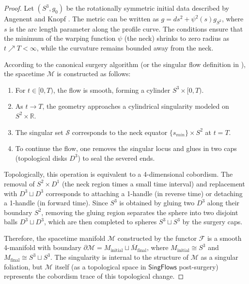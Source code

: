 \documentclass[11pt]{article}
\newcommand{\SingFlows}{\mathsf{SingFlows}}
\begin{document}
\begin{proof}
Let $(S^3, g_0)$ be the rotationally symmetric initial data described by Angenent and Knopf \cite{AK04}. The metric can be written as $g = ds^2 + \psi^2(s) g_{S^2}$, where $s$ is the arc length parameter along the profile curve. The conditions ensure that the minimum of the warping function $\psi$ (the neck) shrinks to zero radius as $t \nearrow T < \infty$, while the curvature remains bounded away from the neck.

According to the canonical surgery algorithm (or the singular flow definition in \cite{KL17}), the spacetime $\mathcal{M}$ is constructed as follows:
\begin{enumerate}
    \item For $t \in [0, T)$, the flow is smooth, forming a cylinder $S^3 \times [0, T)$.
    \item As $t \to T$, the geometry approaches a cylindrical singularity modeled on $S^2 \times \mathbb{R}$.
    \item The singular set $\mathcal{S}$ corresponds to the neck equator $\{s_{min}\} \times S^2$ at $t=T$.
    \item To continue the flow, one removes the singular locus and glues in two caps (topological disks $D^3$) to seal the severed ends.
\end{enumerate}

Topologically, this operation is equivalent to a 4-dimensional cobordism. The removal of $S^2 \times D^1$ (the neck region times a small time interval) and replacement with $D^3 \sqcup D^3$ corresponds to attaching a 1-handle (in reverse time) or detaching a 1-handle (in forward time).
Since $S^3$ is obtained by gluing two $D^3$ along their boundary $S^2$, removing the gluing region separates the sphere into two disjoint balls $D^3 \sqcup D^3$, which are then completed to spheres $S^3 \sqcup S^3$ by the surgery caps.

Therefore, the spacetime manifold $\mathcal{M}$ constructed by the functor $\mathcal{F}$ is a smooth 4-manifold with boundary $\partial \mathcal{M} = M_{\mathrm{initial}} \sqcup \overline{M}_{\mathrm{final}}$, where $M_{\mathrm{initial}} \cong S^3$ and $M_{\mathrm{final}} \cong S^3 \sqcup S^3$. The singularity is internal to the structure of $\mathcal{M}$ as a singular foliation, but $\mathcal{M}$ itself (as a topological space in $\SingFlows$ post-surgery) represents the cobordism trace of this topological change.
\end{proof}
\end{document}
